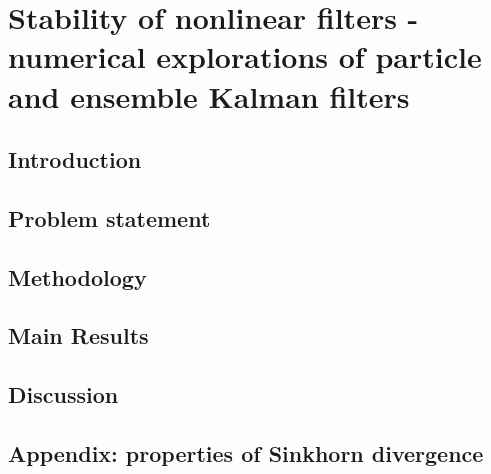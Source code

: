 \chapter{\LARGE \bf
Stability of nonlinear filters - numerical explorations of particle and ensemble Kalman filters
}
\section{Introduction} \label{sec-intro--numerical-fs}


\section{Problem statement} \label{sec-prob--numerical-fs}


\section{Methodology} \label{sec-method--numerical-fs}


\section{Main Results} \label{sec-res--numerical-fs}

\section{Discussion} \label{sec-disc--numerical-fs}



\section{Appendix: properties of Sinkhorn divergence} \label{sec-app--numerical-fs}






